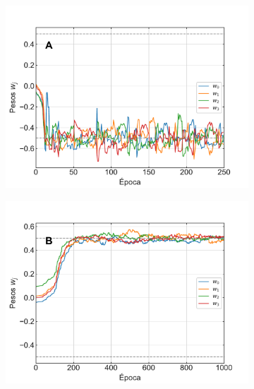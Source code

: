\documentclass[11pt,twocolumn,twoside]{opticajnl}
\begin{document}
\begin{figure}[h]
    \centering
         \begin{subfigure}[b]{0.49\linewidth}
            \centering
            \includegraphics[width=1.1\textwidth]{Figuras/pesos_lr_0.01.pdf}
         \end{subfigure}
         \begin{subfigure}[b]{0.49\linewidth}
            \centering
            \includegraphics[width=1.1\textwidth]{Figuras/pesos_lr_0.001.pdf}
         \end{subfigure}
         \begin{subfigure}[b]{0.49\linewidth}
            \centering

\end{subfigure}
\end{figure}
\end{document}
